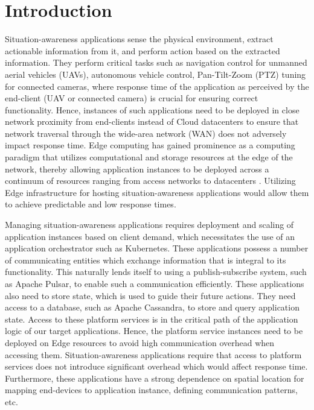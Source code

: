 \chapter{Introduction}
\label{sec:intro}

Situation-awareness applications sense the physical environment, extract actionable information from it, and perform action based on the extracted information. They perform critical tasks such as navigation control for unmanned aerial vehicles (UAVs), autonomous vehicle control, Pan-Tilt-Zoom (PTZ) tuning for connected cameras, where response time of the application as perceived by the end-client (UAV or connected camera) is crucial for ensuring correct functionality. Hence, instances of such applications need to be deployed in close network proximity from end-clients instead of Cloud datacenters to ensure that network traversal through the wide-area network (WAN) does not adversely impact response time. Edge computing has gained prominence as a computing paradigm that utilizes computational and storage resources at the edge of the network, thereby allowing application instances to be deployed across a continuum of resources ranging from access networks to datacenters \cite{ramachandran2021case}. Utilizing Edge infrastructure for hosting situation-awareness applications would allow them to achieve predictable and low response times.
\par Managing situation-awareness applications requires deployment and scaling of application instances based on client demand, which necessitates the use of an application orchestrator such as Kubernetes. These applications possess a number of communicating entities which exchange information that is integral to its functionality. This naturally lends itself to using a publish-subscribe system, such as Apache Pulsar, to enable such a communication efficiently. These applications also need to store state, which is used to guide their future actions. They need access to a database, such as Apache Cassandra, to store and query application state. Access to these platform services is in the critical path of the application logic of our target applications. Hence, the platform service instances need to be deployed on Edge resources to avoid high communication overhead when accessing them. Situation-awareness applications require that access to platform services does not introduce significant overhead which would affect response time. Furthermore, these applications  have a strong dependence on spatial location for mapping end-devices to application instance, defining communication patterns, etc. 

